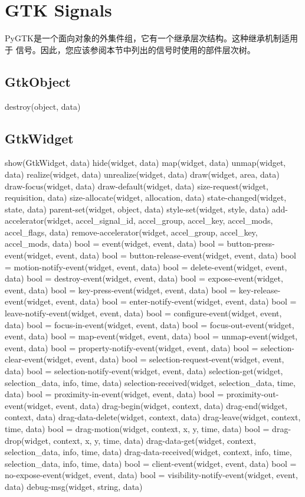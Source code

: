 \chapter{GTK Signals}
PyGTK是一个面向对象的外集件组，它有一个继承层次结构。这种继承机制适用于
信号。因此，您应该参阅本节中列出的信号时使用的部件层次树。
	\section{GtkObject}
	destroy(object, data)
	\section{GtkWidget}
	show(GtkWidget, data)
	hide(widget, data)
	map(widget, data)
	unmap(widget, data)
	realize(widget, data)
	unrealize(widget, data)
	draw(widget, area, data)
	draw-focus(widget, data)
	draw-default(widget, data)
	size-request(widget, requisition, data)
	size-allocate(widget, allocation, data)
	state-changed(widget, state, data)
	parent-set(widget, object, data)
	style-set(widget, style, data)
	add-accelerator(widget, accel_signal_id, accel_group, accel_key, accel_mods,
	accel_flags, data)
	remove-accelerator(widget, accel_group, accel_key, accel_mods, data)
	bool = event(widget, event, data)
	bool = button-press-event(widget, event, data)
	bool = button-release-event(widget, event, data)
	bool = motion-notify-event(widget, event, data)
	bool = delete-event(widget, event, data)
	bool = destroy-event(widget, event, data)
	bool = expose-event(widget, event, data)
	bool = key-press-event(widget, event, data)
	bool = key-release-event(widget, event, data)
	bool = enter-notify-event(widget, event, data)
	bool = leave-notify-event(widget, event, data)
	bool = configure-event(widget, event, data)
	bool = focus-in-event(widget, event, data)
	bool = focus-out-event(widget, event, data)
	bool = map-event(widget, event, data)
	bool = unmap-event(widget, event, data)
	bool = property-notify-event(widget, event, data)
	bool = selection-clear-event(widget, event, data)
	bool = selection-request-event(widget, event, data)
	bool = selection-notify-event(widget, event, data)
	selection-get(widget, selection_data, info, time, data)
	selection-received(widget, selection_data, time, data)
	bool = proximity-in-event(widget, event, data)
	bool = proximity-out-event(widget, event, data)
	drag-begin(widget, context, data)
	drag-end(widget, context, data)
	drag-data-delete(widget, context, data)
	drag-leave(widget, context, time, data)
	bool = drag-motion(widget, context, x, y, time, data)
	bool = drag-drop(widget, context, x, y, time, data)
	drag-data-get(widget, context, selection_data, info, time, data)
	drag-data-received(widget, context, info, time, selection_data,
	info, time, data)
	bool = client-event(widget, event, data)
	bool = no-expose-event(widget, event, data)
	bool = visibility-notify-event(widget, event, data)
	debug-msg(widget, string, data)

